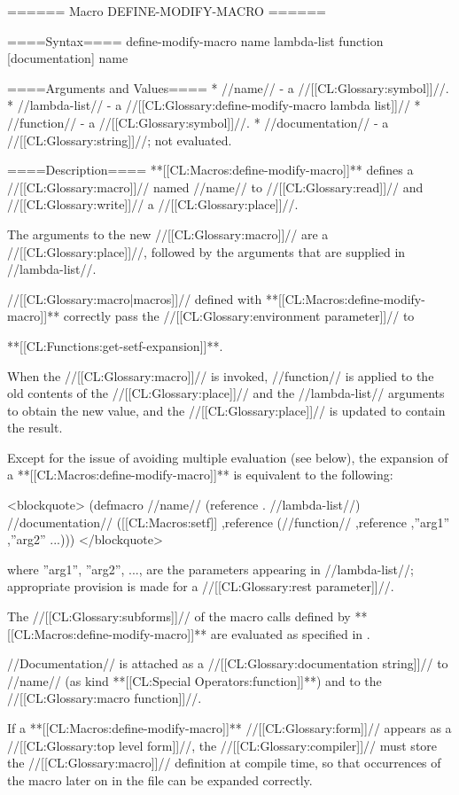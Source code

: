 ====== Macro DEFINE-MODIFY-MACRO ======

====Syntax====
\DefmacWithValues define-modify-macro {name lambda-list function [documentation]} {name}

====Arguments and Values====
  * //name// - a //[[CL:Glossary:symbol]]//.
  * //lambda-list// - a //[[CL:Glossary:define-modify-macro lambda list]]//
  * //function// - a //[[CL:Glossary:symbol]]//.
  * //documentation// - a //[[CL:Glossary:string]]//; not evaluated.

====Description====
**[[CL:Macros:define-modify-macro]]** defines a //[[CL:Glossary:macro]]// named //name// to //[[CL:Glossary:read]]// and //[[CL:Glossary:write]]// a //[[CL:Glossary:place]]//.

The arguments to the new //[[CL:Glossary:macro]]// are a //[[CL:Glossary:place]]//, followed by the arguments that are supplied in //lambda-list//.

//[[CL:Glossary:macro|macros]]// defined with **[[CL:Macros:define-modify-macro]]** correctly pass the //[[CL:Glossary:environment parameter]]// to

**[[CL:Functions:get-setf-expansion]]**.

When the //[[CL:Glossary:macro]]// is invoked, //function// is applied to the old contents of the //[[CL:Glossary:place]]// and the //lambda-list// arguments to obtain the new value, and the //[[CL:Glossary:place]]// is updated to contain the result.

Except for the issue of avoiding multiple evaluation (see below), the expansion of a **[[CL:Macros:define-modify-macro]]** is equivalent to the following:

<blockquote> (defmacro //name// (reference . //lambda-list//) //documentation// \bq([[CL:Macros:setf]] ,reference (//function// ,reference ,''arg1'' ,''arg2'' ...))) </blockquote>

where ''arg1'', ''arg2'', ..., are the parameters appearing in //lambda-list//; appropriate provision is made for a //[[CL:Glossary:rest parameter]]//.

The //[[CL:Glossary:subforms]]// of the macro calls defined by **[[CL:Macros:define-modify-macro]]** are evaluated as specified in \secref\GenRefSubFormEval.

//Documentation// is attached as a //[[CL:Glossary:documentation string]]// to //name// (as kind **[[CL:Special Operators:function]]**) and to the //[[CL:Glossary:macro function]]//.

If a **[[CL:Macros:define-modify-macro]]** //[[CL:Glossary:form]]// appears as a //[[CL:Glossary:top level form]]//, the //[[CL:Glossary:compiler]]// must store the //[[CL:Glossary:macro]]// definition at compile time, so that occurrences of the macro later on in the file can be expanded correctly.

